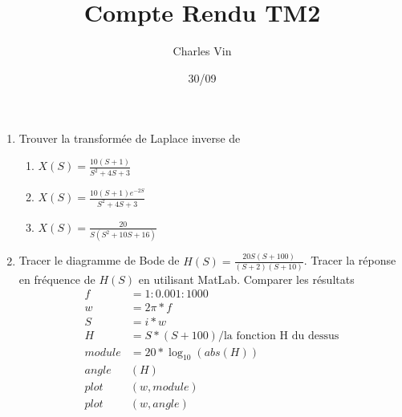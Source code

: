 \documentclass{article}
\title{Compte Rendu TM2}
\author{Charles Vin}
\date{30/09}
\theoremstyle{plain}%
\theoremstyle{definition}
\theoremstyle{remark}
\begin{document}
\maketitle

\begin{enumerate}
    \item Trouver la transformée de Laplace inverse de \begin{enumerate}
        \item $ X(S) = \frac{10 (S+1)}{S^2 + 4S + 3} $ 
        \item $ X(S) = \frac{10 (S+1)e^{-2S}}{S^2 + 4S + 3} $ 
        \item $ X(S) = \frac{20}{S(S^2 + 10S + 16)} $ 
    \end{enumerate} 
    \item Tracer le diagramme de Bode de $ H(S) = \frac{20S(S+100)}{(S+2)(S+10)} $. Tracer la réponse en fréquence de $ H(S) $ en utilisant MatLab. Comparer les résultats \begin{align*}
        f&=1:0.001:1000\\
        w&=2 \pi * f \\
        S&=i*w \\
        H&=S \dot{} * (S+100) / \text{la fonction H du dessus} \\
        module &= 20 * \log_{10} (abs(H)) \\
        angle&(H) \\
        plot&(w, module) \\
        plot&(w, angle) \\
    \end{align*}
\end{enumerate}
\end{document}
